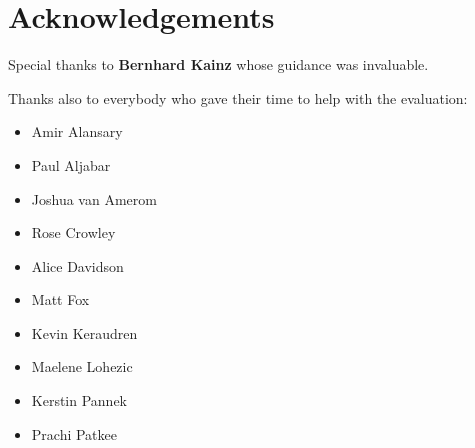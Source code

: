 \chapter*{Acknowledgements}

Special thanks to \textbf{Bernhard Kainz} whose guidance was invaluable.

Thanks also to everybody who gave their time to help with the evaluation:

\begin{itemize}
	\item Amir Alansary
	\item Paul Aljabar
	\item Joshua van Amerom
	\item Rose Crowley
	\item Alice Davidson
	\item Matt Fox
	\item Kevin Keraudren
	\item Maelene Lohezic
	\item Kerstin Pannek
	\item Prachi Patkee
\end{itemize}